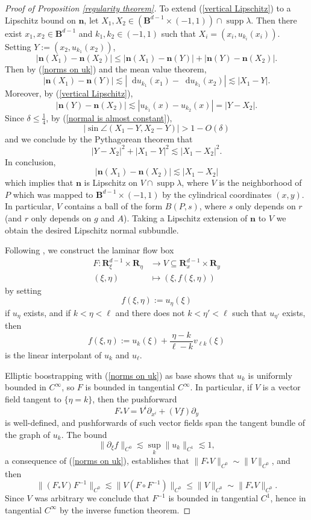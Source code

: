 \documentclass[reqno,11pt]{amsart}
\newcommand{\RR}{\mathbf{R}}
\newcommand{\Ball}{\mathbf{B}}
\newcommand*\dif{\mathop{}\!\mathrm{d}}
\DeclareMathOperator{\supp}{supp}
\newcommand{\normal}{\mathbf n}
\theoremstyle{definition}
\numberwithin{equation}{section}
\begin{document}
\begin{proof}[Proof of Proposition \ref{regularity theorem}]
To extend (\ref{vertical Lipschitz}) to a Lipschitz bound on $\normal$, let $X_1, X_2 \in (\Ball^{d - 1} \times (-1, 1)) \cap \supp \lambda$.
Then there exist $x_1, x_2 \in \Ball^{d - 1}$ and $k_1, k_2 \in (-1, 1)$ such that $X_i = (x_i, u_{k_i}(x_i))$.
Setting $Y := (x_2, u_{k_1}(x_2))$,
$$|\normal(X_1) - \normal(X_2)| \leq |\normal(X_1) - \normal(Y)| + |\normal(Y) - \normal(X_2)|.$$
Then by (\ref{norms on uk}) and the mean value theorem,
$$|\normal(X_1) - \normal(Y)| \lesssim |\dif u_{k_1}(x_1) - \dif u_{k_1}(x_2)| \lesssim |X_1 - Y|.$$
Moreover, by (\ref{vertical Lipschitz}),
$$|\normal(Y) - \normal(X_2)| \lesssim |u_{k_1}(x) - u_{k_2}(x)| = |Y - X_2|.$$
Since $\delta \leq \frac{1}{4}$, by (\ref{normal is almost constant}),
$$|\sin \angle(X_1 - Y, X_2 - Y)| > 1 - O(\delta)$$
and we conclude by the Pythagorean theorem that
$$|Y - X_2|^2 + |X_1 - Y|^2 \lesssim |X_1 - X_2|^2.$$
In conclusion,
$$|\normal(X_1) - \normal(X_2)| \lesssim |X_1 - X_2|$$
which implies that $\normal$ is Lipschitz on $V \cap \supp \lambda$, where $V$ is the neighborhood of $P$ which was mapped to $\Ball^{d - 1} \times (-1, 1)$ by the cylindrical coordinates $(x, y)$.
In particular, $V$ contains a ball of the form $B(P, s)$, where $s$ only depends on $r$ (and $r$ only depends on $g$ and $A$).
Taking a Lipschitz extension of $\normal$ to $V$ we obtain the desired Lipschitz normal subbundle.

Following \cite[Appendix B]{ColdingMinicozziIV}, we construct the laminar flow box
\begin{align*}
	F: \RR^{d - 1}_\xi \times \RR_\eta &\to V \subseteq \RR^{d - 1}_x \times \RR_y \\
	(\xi, \eta) &\mapsto (\xi, f(\xi, \eta))
\end{align*}
by setting
$$f(\xi, \eta) := u_\eta(\xi)$$
if $u_\eta$ exists, and if $k < \eta < \ell$ and there does not $k < \eta' < \ell$ such that $u_{\eta'}$ exists, then
$$f(\xi, \eta) := u_k(\xi) + \frac{\eta - k}{\ell - k} v_{\ell k}(\xi)$$
is the linear interpolant of $u_k$ and $u_\ell$.

Elliptic boostrapping with (\ref{norms on uk}) as base shows that $u_k$ is uniformly bounded in $C^\infty$, so $F$ is bounded in tangential $C^\infty$.
In particular, if $V$ is a vector field tangent to $\{\eta = k\}$, then the pushforward
$$F_* V = V^i \partial_{x^i} + (Vf) \partial_y$$
is well-defined, and pushforwards of such vector fields span the tangent bundle of the graph of $u_k$. 
The bound
\begin{equation}\label{xiLip of f}
	\|\partial_\xi f\|_{C^0} \lesssim \sup_k \|u_k\|_{C^1} \lesssim 1,
\end{equation}
a consequence of (\ref{norms on uk}), establishes that $\|F_* V\|_{C^0} \sim \|V\|_{C^0}$, and then 
$$\|(F_* V) F^{-1}\|_{C^0} \lesssim \|V(F \circ F^{-1})\|_{C^0} \leq \|V\|_{C^0} \sim \|F_* V\|_{C^0}.$$
Since $V$ was arbitrary we conclude that $F^{-1}$ is bounded in tangential $C^1$, hence in tangential $C^\infty$ by the inverse function theorem. 


\end{proof}
\end{document}
